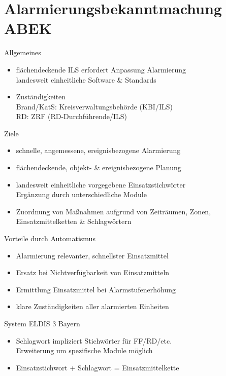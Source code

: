 \section{Alarmierungsbekanntmachung ABEK}
\begin{sectionbox}{Allgemeines}
    \begin{itemize}
        \item flächendeckende ILS erfordert Anpassung Alarmierung\\
        \ra landesweit einheitliche Software \& Standards
        \item Zuständigkeiten\\
        \ra Brand/KatS: Kreisverwaltungsbehörde (KBI/ILS)\\
        \ra RD: ZRF (RD-Durchführende/ILS)
    \end{itemize}
\end{sectionbox}
\begin{sectionbox}{Ziele}
    \begin{itemize}
        \item schnelle, angemessene, ereignisbezogene Alarmierung
        \item flächendeckende, objekt- \& ereignisbezogene Planung
        \item landesweit einheitliche vorgegebene Einsatzstichwörter\\
        \ra Ergänzung durch unterschiedliche Module
        \item Zuordnung von Maßnahmen aufgrund von Zeiträumen, Zonen, Einsatzmittelketten \& Schlagwörtern
    \end{itemize}
\end{sectionbox}
\begin{sectionbox}{Vorteile durch Automatismus}
    \begin{itemize}
        \item Alarmierung relevanter, schnellster Einsatzmittel
        \item Ersatz bei Nichtverfügbarkeit von Einsatzmitteln
        \item Ermittlung Einsatzmittel bei Alarmstufenerhöhung
        \item klare Zuständigkeiten aller alarmierten Einheiten
    \end{itemize}
\end{sectionbox}
\begin{sectionbox}{System ELDIS 3 Bayern}
    \begin{itemize}
        \item Schlagwort impliziert Stichwörter für FF/RD/etc.\\
        \ra Erweiterung um spezifische Module möglich
        \item Einsatzstichwort + Schlagwort = Einsatzmittelkette
    \end{itemize}
\end{sectionbox}